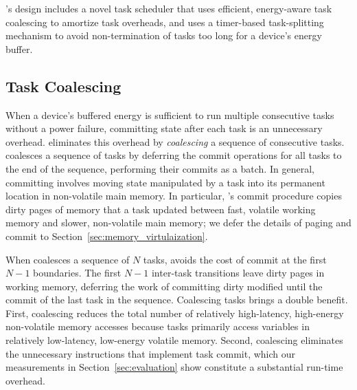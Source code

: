 \sys's design includes a novel task scheduler that uses efficient,
energy-aware task coalescing to amortize task overheads, and uses a timer-based
task-splitting mechanism to avoid non-termination of tasks too long
for a device's energy buffer. 

\subsection{Task Coalescing}
\label{sec:task_coalescing}


When a device's buffered energy is sufficient to run multiple consecutive tasks
without a power failure, committing state after each task is an unnecessary
overhead. \sys eliminates this overhead by {\em coalescing} a sequence of
consecutive tasks. \sys coalesces a sequence of tasks by deferring the commit
operations for all tasks to the end of the sequence, performing their commits
as a batch.  In general, committing involves moving state manipulated by a task
into its permanent location in non-volatile main memory.  In particular, \sys's
commit procedure copies dirty pages of memory that a task updated between fast,
volatile working memory and slower, non-volatile main memory; we defer the
details of paging and commit to Section~\ref{sec:memory_virtulaization}.

When \sys coalesces a sequence of $N$ tasks, \sys avoids the cost of commit at
the first $N-1$ boundaries. The first $N-1$ inter-task transitions leave
dirty pages in working memory, deferring the work of committing dirty modified
until the commit of the last task in the sequence.  Coalescing tasks brings a
double benefit. First, coalescing reduces the total number of relatively
high-latency, high-energy non-volatile memory accesses because tasks primarily
access variables in relatively low-latency, low-energy volatile memory.
Second, coalescing eliminates the unnecessary instructions that implement task
commit, which our measurements in Section~\ref{sec:evaluation} show constitute
a substantial run-time overhead.

 
